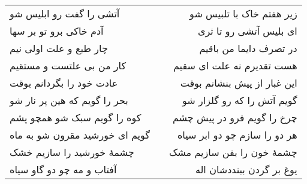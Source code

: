 \begin{center}
\begin{longtable}{l p{0.5cm} r}
آتشی را گفت رو ابلیس شو
&&
زیر هفتم خاک با تلبیس شو
\\
آدم خاکی برو تو بر سها
&&
ای بلیس آتشی رو تا ثری
\\
چار طبع و علت اولی نیم
&&
در تصرف دایما من باقیم
\\
کار من بی علتست و مستقیم
&&
هست تقدیرم نه علت ای سقیم
\\
عادت خود را بگردانم بوقت
&&
این غبار از پیش بنشانم بوقت
\\
بحر را گویم که هین پر نار شو
&&
گویم آتش را که رو گلزار شو
\\
کوه را گویم سبک شو همچو پشم
&&
چرخ را گویم فرو در پیش چشم
\\
گویم ای خورشید مقرون شو به ماه
&&
هر دو را سازم چو دو ابر سیاه
\\
چشمهٔ خورشید را سازیم خشک
&&
چشمهٔ خون را بفن سازیم مشک
\\
آفتاب و مه چو دو گاو سیاه
&&
یوغ بر گردن ببنددشان اله
\\
\end{longtable}
\end{center}

